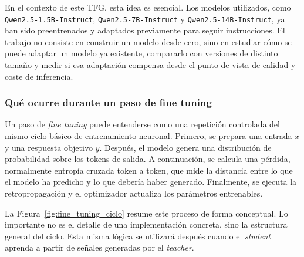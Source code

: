 En el contexto de este TFG, esta idea es esencial. Los modelos utilizados, como \texttt{Qwen2.5-1.5B-Instruct}, \texttt{Qwen2.5-7B-Instruct} y \texttt{Qwen2.5-14B-Instruct}, ya han sido preentrenados y adaptados previamente para seguir instrucciones. El trabajo no consiste en construir un modelo desde cero, sino en estudiar cómo se puede adaptar un modelo ya existente, compararlo con versiones de distinto tamaño y medir si esa adaptación compensa desde el punto de vista de calidad y coste de inferencia.

\subsubsection{Qué ocurre durante un paso de fine tuning}

Un paso de \textit{fine tuning} puede entenderse como una repetición controlada del mismo ciclo básico de entrenamiento neuronal. Primero, se prepara una entrada $x$ y una respuesta objetivo $y$. Después, el modelo genera una distribución de probabilidad sobre los tokens de salida. A continuación, se calcula una pérdida, normalmente entropía cruzada token a token, que mide la distancia entre lo que el modelo ha predicho y lo que debería haber generado. Finalmente, se ejecuta la retropropagación y el optimizador actualiza los parámetros entrenables.

La Figura~\ref{fig:fine_tuning_ciclo} resume este proceso de forma conceptual. Lo importante no es el detalle de una implementación concreta, sino la estructura general del ciclo. Esta misma lógica se utilizará después cuando el \textit{student} aprenda a partir de señales generadas por el \textit{teacher}.

